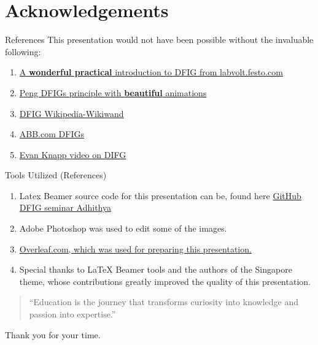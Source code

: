 \documentclass{beamer}
\begin{document}
\section{Acknowledgements}
\begin{frame}{References}
    This presentation would not have been possible without the invaluable following:
    \vspace{0.1in}
    \begin{enumerate}
        \item \href{https://web.archive.org/web/20230526092355/https://labvolt.festo.com/downloads/86376_F0.pdf}{A \textbf{wonderful practical} introduction to DFIG from labvolt.festo.com}

      \item \href{https://www.pengky.cn/zz-horizontal-axis-turbine/13-doubly-fed-wind-turbine-principle/doubly-fed-wind-turbine-principle.html}{Peng DFIGs principle with \textbf{beautiful} animations}
      
        \item \href{https://www.wikiwand.com/en/Doubly_fed_electric_machine}{DFIG Wikipedia-Wikiwand}

        
        \item \href{https://new.abb.com/motors-generators/generators/generators-for-renewables/doubly-fed-generators}{ABB.com DFIGs}
        
        \item \href{https://www.youtube.com/watch?v=Fvc2I0L2vMU}{Evan Knapp video on DIFG}
        
        \end{enumerate}
\end{frame}

\begin{frame}{Tools Utilized (References)}
    \begin{enumerate}
        \item Latex Beamer source code for this presentation can be, found here  \href{https://github.com/200901002/DFIG-Seminar}{GitHub DFIG seminar Adhithya}
        
        \item Adobe Photoshop was used to edit some of the images.

        \item \href{https://www.overleaf.com}{Overleaf.com, which was used for preparing this presentation.}
        
        \item Special thanks to LaTeX Beamer tools and the authors of the Singapore theme, whose contributions greatly improved the quality of this presentation.
    \end{enumerate}
\vspace{0.2in}

\begin{quote}
    \textcolor{mbrown}{``Education is the journey that transforms curiosity into knowledge and passion into expertise.''}
\end{quote}

\begin{center}
        {\Large{Thank you for your time.}}
\end{center}
\end{frame}
\end{document}
